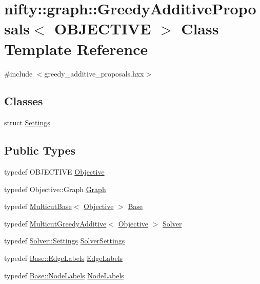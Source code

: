 \hypertarget{classnifty_1_1graph_1_1GreedyAdditiveProposals}{}\section{nifty\+:\+:graph\+:\+:Greedy\+Additive\+Proposals$<$ O\+B\+J\+E\+C\+T\+I\+V\+E $>$ Class Template Reference}
\label{classnifty_1_1graph_1_1GreedyAdditiveProposals}


{\ttfamily \#include $<$greedy\+\_\+additive\+\_\+proposals.\+hxx$>$}

\subsection*{Classes}
\begin{DoxyCompactItemize}
\item 
struct \hyperlink{structnifty_1_1graph_1_1GreedyAdditiveProposals_1_1Settings}{Settings}
\end{DoxyCompactItemize}
\subsection*{Public Types}
\begin{DoxyCompactItemize}
\item 
typedef O\+B\+J\+E\+C\+T\+I\+V\+E \hyperlink{classnifty_1_1graph_1_1GreedyAdditiveProposals_a678640a8ae0ec9d3f7cf3df4fab0ccd6}{Objective}
\item 
typedef Objective\+::\+Graph \hyperlink{classnifty_1_1graph_1_1GreedyAdditiveProposals_a0dd1872c8c0b128ba99bd4e80de7e884}{Graph}
\item 
typedef \hyperlink{classnifty_1_1graph_1_1MulticutBase}{Multicut\+Base}$<$ \hyperlink{classnifty_1_1graph_1_1GreedyAdditiveProposals_a678640a8ae0ec9d3f7cf3df4fab0ccd6}{Objective} $>$ \hyperlink{classnifty_1_1graph_1_1GreedyAdditiveProposals_aa088cd2fe857e6fa292c96f7c9ffbc00}{Base}
\item 
typedef \hyperlink{classnifty_1_1graph_1_1MulticutGreedyAdditive}{Multicut\+Greedy\+Additive}$<$ \hyperlink{classnifty_1_1graph_1_1GreedyAdditiveProposals_a678640a8ae0ec9d3f7cf3df4fab0ccd6}{Objective} $>$ \hyperlink{classnifty_1_1graph_1_1GreedyAdditiveProposals_aa17e097066aa4843f58f9ae238d6780d}{Solver}
\item 
typedef \hyperlink{classnifty_1_1graph_1_1MulticutGreedyAdditive_ab14192647e24d574c75538087acfd090}{Solver\+::\+Settings} \hyperlink{classnifty_1_1graph_1_1GreedyAdditiveProposals_a5e0d6650fd55809c376a1f3b550e9d65}{Solver\+Settings}
\item 
typedef \hyperlink{classnifty_1_1graph_1_1MulticutBase_aaeefe3c5df81d9c9efffec878cf2fcd7}{Base\+::\+Edge\+Labels} \hyperlink{classnifty_1_1graph_1_1GreedyAdditiveProposals_a76d340937deac0d3b99e4a5df0a1cb6b}{Edge\+Labels}
\item 
typedef \hyperlink{classnifty_1_1graph_1_1MulticutBase_afba61ad2919d0fad20b3745af19309da}{Base\+::\+Node\+Labels} \hyperlink{classnifty_1_1graph_1_1GreedyAdditiveProposals_aeec70a0521e576f19b603759f4e67ff4}{Node\+Labels}
\end{DoxyCompactItemize}
